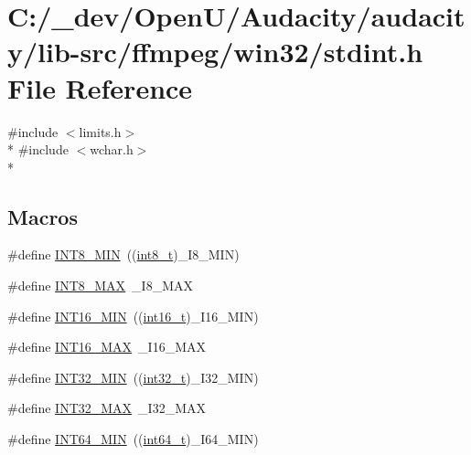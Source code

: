 \hypertarget{lib-src_2ffmpeg_2win32_2stdint_8h}{}\section{C\+:/\+\_\+dev/\+Open\+U/\+Audacity/audacity/lib-\/src/ffmpeg/win32/stdint.h File Reference}
\label{lib-src_2ffmpeg_2win32_2stdint_8h}
{\ttfamily \#include $<$limits.\+h$>$}\\*
{\ttfamily \#include $<$wchar.\+h$>$}\\*
\subsection*{Macros}
\begin{DoxyCompactItemize}
\item 
\#define \hyperlink{lib-src_2ffmpeg_2win32_2stdint_8h_aadcf2a81af243df333b31efa6461ab8e}{I\+N\+T8\+\_\+\+M\+IN}~((\hyperlink{lib-src_2ffmpeg_2win32_2stdint_8h_a27eddd12ef1271a2ea8629e1148e7e63}{int8\+\_\+t})\+\_\+\+I8\+\_\+\+M\+IN)
\item 
\#define \hyperlink{lib-src_2ffmpeg_2win32_2stdint_8h_aaf7f29f45f1a513b4748a4e5014ddf6a}{I\+N\+T8\+\_\+\+M\+AX}~\+\_\+\+I8\+\_\+\+M\+AX
\item 
\#define \hyperlink{lib-src_2ffmpeg_2win32_2stdint_8h_ad4e9955955b27624963643eac448118a}{I\+N\+T16\+\_\+\+M\+IN}~((\hyperlink{lib-src_2ffmpeg_2win32_2stdint_8h_a044293bfeff56852a28ed6c2cfbb2649}{int16\+\_\+t})\+\_\+\+I16\+\_\+\+M\+IN)
\item 
\#define \hyperlink{lib-src_2ffmpeg_2win32_2stdint_8h_ac58f2c111cc9989c86db2a7dc4fd84ca}{I\+N\+T16\+\_\+\+M\+AX}~\+\_\+\+I16\+\_\+\+M\+AX
\item 
\#define \hyperlink{lib-src_2ffmpeg_2win32_2stdint_8h_a688eb21a22db27c2b2bd5836943cdcbe}{I\+N\+T32\+\_\+\+M\+IN}~((\hyperlink{lib-src_2ffmpeg_2win32_2stdint_8h_a37994e3b11c72957c6f454c6ec96d43d}{int32\+\_\+t})\+\_\+\+I32\+\_\+\+M\+IN)
\item 
\#define \hyperlink{lib-src_2ffmpeg_2win32_2stdint_8h_a181807730d4a375f848ba139813ce04f}{I\+N\+T32\+\_\+\+M\+AX}~\+\_\+\+I32\+\_\+\+M\+AX
\item 
\#define \hyperlink{lib-src_2ffmpeg_2win32_2stdint_8h_ab21f12f372f67b8ff0aa3432336ede67}{I\+N\+T64\+\_\+\+M\+IN}~((\hyperlink{lib-src_2ffmpeg_2win32_2stdint_8h_a67a9885ef4908cb72ce26d75b694386c}{int64\+\_\+t})\+\_\+\+I64\+\_\+\+M\+IN)

\end{DoxyCompactItemize}
